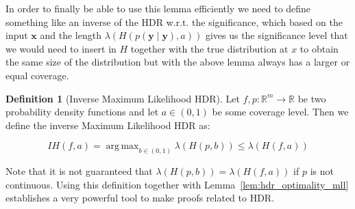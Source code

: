 \documentclass{article}
\DeclareMathOperator*{\argmax}{arg\,max}
\theoremstyle{definition}
\newtheorem{definition}{Definition}[section]
\begin{document}
In order to finally be able to use this lemma efficiently we need to define something like an inverse of the HDR w.r.t. the significance, which based on the input $\mathbf{x}$ and the length $\lambda(H(p(\mathbf{y} \mid \mathbf{y}), a))$ gives us the significance level that we would need to insert in $H$ together with the true distribution at $x$ to obtain the same size of the distribution but with the above lemma always has a larger or equal coverage.

\begin{definition}[Inverse Maximum Likelihood HDR]
Let $f,p : \mathbb{R}^m \to \mathbb{R}$ be two probability density functions and let $a \in (0,1)$ be some coverage level. Then we define the inverse Maximum Likelihood HDR as:

$$IH(f, a) = \argmax_{b \in (0,1)} \lambda(H(p, b)) \leq \lambda(H(f, a))$$

\end{definition}
Note that it is not guaranteed that $\lambda(H(p, b)) = \lambda(H(f, a))$ if $p$ is not continuous. Using this definition together with Lemma~\ref{lem:hdr_optimality_mll} establishes a very powerful tool to make proofs related to HDR.
\end{document}
